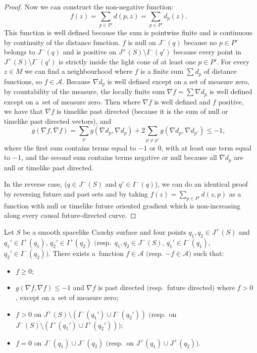 \documentclass[pdftex]{sigma}
\newcommand{\parenthese}[1]{\left( {#1} \right)}
\begin{document}
\begin{proof}
Now we can construct the non-negative function:
\[
f(z) = \sum_{p \in P'} d(p,z) = \sum_{p \in P'} d_p(z).
\]
This function is well def\/ined because the sum is pointwise f\/inite and is continuous by continuity of the distance function. $f$ is null on $J^-(q)$ because no $p \in P'$ belongs to $J^-(q)$ and is positive on $J^+(S) \setminus I^-(q')$ because every point in $J^+(S) \setminus I^-(q')$ is strictly inside the light cone of at least one $p \in P'$. For every $z \in M$ we can f\/ind a neighbourhood where $f$ is  a f\/inite sum $\sum d_p$ of distance functions, so $f\in\mathcal A$. Because $\nabla d_p$ is well def\/ined except on a set of measure zero, by countability of the measure, the locally f\/inite sum $\nabla f = \sum \nabla d_p$ is well def\/ined except on a~set of measure zero. Then where $\nabla f$ is well def\/ined and $f$ positive, we have that $\nabla f$ is timelike past directed (because it is the sum of null or timelike past directed vectors), and
\[
g( \nabla f, \nabla f ) =  \sum_{p} g( \nabla d_p, \nabla d_p ) +  2 \sum_{p \neq p'} g( \nabla d_p, \nabla d_{p'} ) \leq -1,
\]
where the f\/irst sum contains terms equal to $-1$ or $0$, with at least one term equal to $-1$, and the second sum contains terms negative or null because all $\nabla d_p$ are null or timelike past directed.

In the reverse case, ($q \in J^-(S)$ and $q' \in I^-(q)$), we can do an identical proof by reversing future and past sets and by taking $f(z) = \sum_{p \in P'} d(z,p)$ as a function with null or timelike future oriented gradient which is non-increasing along every causal future-directed curve.
\end{proof}

\begin{corollary}\label{corollaryprincipal}
Let $S$ be a smooth spacelike Cauchy surface and four points $q_1,q_2 \in J^+(S)$ and $q_1' \in I^+(q_1)$, $q_2' \in I^+(q_2)$ $($resp.\ $q_1,q_2 \in J^-(S)$, $q_1' \in I^-(q_1)$, $q_2' \in I^-(q_2))$. There exists a~function $f \in \mathcal A$ $($resp. $-f \in \mathcal A)$ such that:
\begin{itemize}\itemsep=0pt
\item $f \geq 0 $;
\item $g( \nabla f, \nabla f ) \leq -1$ and $\nabla f$ is past directed $($resp.\ future directed$)$ where $f > 0$, except on a~set of measure zero;
\item $f > 0$ on $J^+(S) \setminus \parenthese{I^-(q_1') \cup I^-(q_2')}$ $($resp.\ on $J^-(S) \setminus \parenthese{I^+(q_1') \cup I^+(q_2')})$;
\item $f = 0$ on $J^-(q_1) \cup J^-(q_2)$ $($resp.\ on $J^+(q_1) \cup J^+(q_2))$.
\end{itemize}
\end{corollary}
\end{document}
